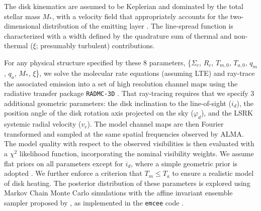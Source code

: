 \documentclass[twocolumn]{aastex6}
\begin{document}
The disk kinematics are assumed to be Keplerian and dominated by the total stellar mass $M_{\ast}$, with a velocity field that appropriately accounts for the two-dimensional distribution of the emitting layer \citep[see][]{rosenfeld13a}.  The  line-spread function is characterized with a width defined by the quadrature sum of thermal and non-thermal ($\xi$; presumably turbulent) contributions.

For any physical structure specified by these 8 parameters, \{$\Sigma_c$, $R_c$, $T_{m,0}$, $T_{a,0}$, $q_m$, $q_a$, $M_\ast$, $\xi$\}, we solve the molecular rate equations (assuming LTE) and ray-trace the associated emission into a set of high resolution channel maps using the radiative transfer package {\tt RADMC-3D} \citep{dullemond12}.  That ray-tracing requires that we specify 3 additional geometric parameters: the disk inclination to the line-of-sight ($i_d$), the position angle of the disk rotation axis projected on the sky ($\varphi_d$), and the LSRK systemic radial velocity ($v_r$).  The model channel maps are then Fourier transformed and sampled at the same spatial frequencies observed by ALMA.  The model quality with respect to the observed visibilities is then evaluated with a $\chi^2$ likelihood function, incorporating the nominal visibility weights.  We assume flat priors on all parameters except for $i_d$, where a simple geometric prior is adopted \citep{czekala16}.  We further enforce a criterion that $T_m \leq T_a$ to ensure a realistic model of disk heating.  The posterior distribution of these parameters is explored using Markov Chain Monte Carlo simulations with the affine invariant ensemble sampler proposed by \citet{goodman10}, as implemented in the {\tt emcee} code \citep{foreman-mackey13}.
\end{document}
